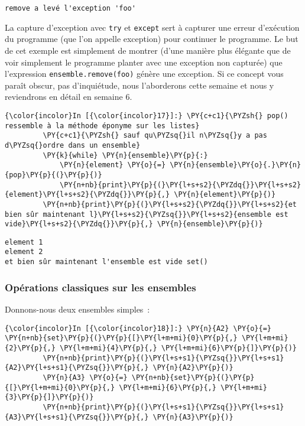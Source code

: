     \begin{Verbatim}[commandchars=\\\{\}]
remove a levé l'exception 'foo'

    \end{Verbatim}

    La capture d'exception avec \texttt{try} et \texttt{except} sert à
capturer une erreur d'exécution du programme (que l'on appelle
exception) pour continuer le programme. Le but de cet exemple est
simplement de montrer (d'une manière plus élégante que de voir
simplement le programme planter avec une exception non capturée) que
l'expression
\texttt{ensemble.remove(\textquotesingle{}foo\textquotesingle{})} génère
une exception. Si ce concept vous paraît obscur, pas d'inquiétude, nous
l'aborderons cette semaine et nous y reviendrons en détail en semaine 6.

    \begin{Verbatim}[commandchars=\\\{\}]
{\color{incolor}In [{\color{incolor}17}]:} \PY{c+c1}{\PYZsh{} pop() ressemble à la méthode éponyme sur les listes}
         \PY{c+c1}{\PYZsh{} sauf qu\PYZsq{}il n\PYZsq{}y a pas d\PYZsq{}ordre dans un ensemble}
         \PY{k}{while} \PY{n}{ensemble}\PY{p}{:}
             \PY{n}{element} \PY{o}{=} \PY{n}{ensemble}\PY{o}{.}\PY{n}{pop}\PY{p}{(}\PY{p}{)}
             \PY{n+nb}{print}\PY{p}{(}\PY{l+s+s2}{\PYZdq{}}\PY{l+s+s2}{element}\PY{l+s+s2}{\PYZdq{}}\PY{p}{,} \PY{n}{element}\PY{p}{)}
         \PY{n+nb}{print}\PY{p}{(}\PY{l+s+s2}{\PYZdq{}}\PY{l+s+s2}{et bien sûr maintenant l}\PY{l+s+s2}{\PYZsq{}}\PY{l+s+s2}{ensemble est vide}\PY{l+s+s2}{\PYZdq{}}\PY{p}{,} \PY{n}{ensemble}\PY{p}{)}
\end{Verbatim}


    \begin{Verbatim}[commandchars=\\\{\}]
element 1
element 2
et bien sûr maintenant l'ensemble est vide set()

    \end{Verbatim}

    \hypertarget{opuxe9rations-classiques-sur-les-ensembles}{%
\subsubsection{Opérations classiques sur les
ensembles}\label{opuxe9rations-classiques-sur-les-ensembles}}

    Donnons-nous deux ensembles simples~:

    \begin{Verbatim}[commandchars=\\\{\}]
{\color{incolor}In [{\color{incolor}18}]:} \PY{n}{A2} \PY{o}{=} \PY{n+nb}{set}\PY{p}{(}\PY{p}{[}\PY{l+m+mi}{0}\PY{p}{,} \PY{l+m+mi}{2}\PY{p}{,} \PY{l+m+mi}{4}\PY{p}{,} \PY{l+m+mi}{6}\PY{p}{]}\PY{p}{)}
         \PY{n+nb}{print}\PY{p}{(}\PY{l+s+s1}{\PYZsq{}}\PY{l+s+s1}{A2}\PY{l+s+s1}{\PYZsq{}}\PY{p}{,} \PY{n}{A2}\PY{p}{)}
         \PY{n}{A3} \PY{o}{=} \PY{n+nb}{set}\PY{p}{(}\PY{p}{[}\PY{l+m+mi}{0}\PY{p}{,} \PY{l+m+mi}{6}\PY{p}{,} \PY{l+m+mi}{3}\PY{p}{]}\PY{p}{)}
         \PY{n+nb}{print}\PY{p}{(}\PY{l+s+s1}{\PYZsq{}}\PY{l+s+s1}{A3}\PY{l+s+s1}{\PYZsq{}}\PY{p}{,} \PY{n}{A3}\PY{p}{)}
\end{Verbatim}


